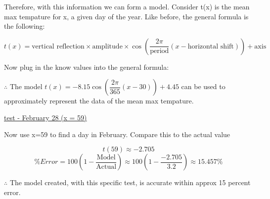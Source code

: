 \documentclass[12pt]{book}
\begin{document}
\begin{enumerate}
\vspace{1cm}
Therefore, with this information we can form a model. 
Consider t(x) is the mean max tempature for x, a given day of the year. 
Like before, the general formula is the following:

$$t(x) = \text{vertical reflection} \times \text{amplitude} \times \cos\left( \dfrac{2\pi}{\text{period}}  (x - \text{horizontal shift}) \right) + \text{axis}$$

\newpage

\begin{center}
    Now plug in the know values into the general formula:
\end{center}

$\therefore$ The model $\boxed{t(x) = -8.15\cos\left( \dfrac{2\pi}{365} (x - 30) \right) + 4.45}$ can be used to approximately represent the data of the mean max tempature.

\vspace{0.3cm}
\underline{test - February 28 (x = 59)}

Now use x=59 to find a day in February. Compare this to the actual value

$$t(59) \approx -2.705$$
\vspace{0.1cm}
$$\% Error = 100\left(1-\dfrac{\text{Model}}{\text{Actual}}\right) \approx 100\left(1-\dfrac{-2.705}{3.2}\right) \approx \boxed{15.457\%}$$

\begin{center}
    $\therefore$ The model created, with this specific test, is accurate within approx 15 percent error.
\end{center}

\newpage


\end{enumerate}
\end{document}
